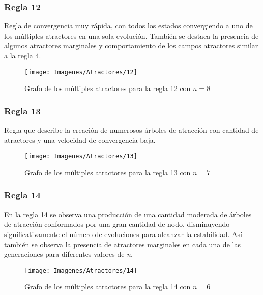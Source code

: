 \documentclass[]{article}
\begin{document}
			
			\newpage
			\subsubsection{Regla 12}
				\justifying	
				Regla de convergencia muy rápida, con todos los estados convergiendo a uno de los múltiples atractores en una sola evolución. También se destaca la presencia de algunos atractores marginales y comportamiento de los campos atractores similar a la regla 4.
				
				
				\hfill\break
				\hfill\break
				\hfill\break
				\begin{figure}[!h]
					\centering
					\texttt{[image: Imagenes/Atractores/12]}
					\caption{Grafo de los múltiples atractores para la regla 12 con $n=8$}
					\label{Regla_12}
				\end{figure}
				
			
			\newpage
			\subsubsection{Regla 13}
				\justifying
				Regla que describe la creación de numerosos árboles de atracción con cantidad de atractores y una velocidad de convergencia baja.
				
				\hfill\break
				\hfill\break
				\hfill\break
				\begin{figure}[!h]
					\centering
					\texttt{[image: Imagenes/Atractores/13]}
					\caption{Grafo de los múltiples atractores para la regla 13 con $n=7$}
					\label{Regla_13}
				\end{figure}
				
			\newpage
			\subsubsection{Regla 14}
				\justifying
				En la regla 14 se observa una producción de una cantidad moderada de árboles de atracción conformados por una gran cantidad de nodo, disminuyendo significativamente el número de evoluciones para alcanzar la estabilidad. Así también se observa la presencia de atractores marginales en cada una de las generaciones para diferentes valores de \textit{n}.
				
				\hfill\break
				\hfill\break
				\hfill\break
				\begin{figure}[!h]
					\centering
					\texttt{[image: Imagenes/Atractores/14]}
					\caption{Grafo de los múltiples atractores para la regla 14 con $n=6$}
					\label{Regla_14}
				\end{figure}
				
\end{document}

